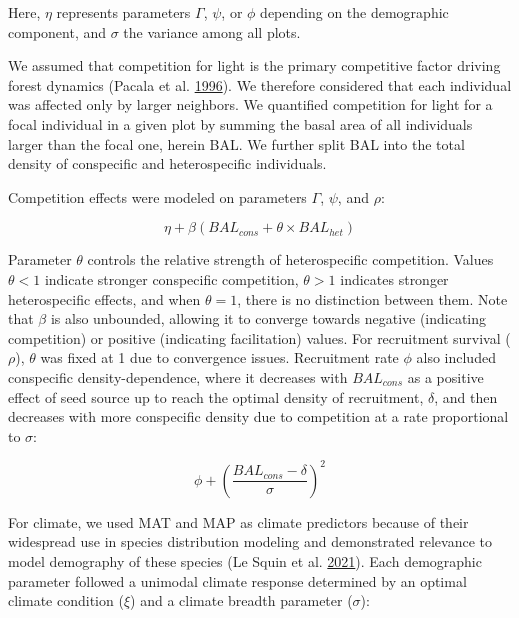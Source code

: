 \documentclass[12pt]{article}
\begin{document}
Here, \(\eta\) represents parameters \(\Gamma\), \(\psi\), or \(\phi\)
depending on the demographic component, and \(\sigma\) the variance
among all plots.

We assumed that competition for light is the primary competitive factor
driving forest dynamics (Pacala et al.
\protect\hyperlink{ref-Pacala1996a}{1996}). We therefore considered that
each individual was affected only by larger neighbors. We quantified
competition for light for a focal individual in a given plot by summing
the basal area of all individuals larger than the focal one, herein BAL.
We further split BAL into the total density of conspecific and
heterospecific individuals.

Competition effects were modeled on parameters \(\Gamma\), \(\psi\), and
\(\rho\):

\begin{equation}
\eta + \beta (BAL_{cons} + \theta \times BAL_{het})
\label{eq:compEffect}\end{equation}

Parameter \(\theta\) controls the relative strength of heterospecific
competition. Values \(\theta < 1\) indicate stronger conspecific
competition, \(\theta > 1\) indicates stronger heterospecific effects,
and when \(\theta = 1\), there is no distinction between them. Note that
\(\beta\) is also unbounded, allowing it to converge towards negative
(indicating competition) or positive (indicating facilitation) values.
For recruitment survival (\(\rho\)), \(\theta\) was fixed at 1 due to
convergence issues. Recruitment rate \(\phi\) also included conspecific
density-dependence, where it decreases with \(BAL_{cons}\) as a positive
effect of seed source up to reach the optimal density of recruitment,
\(\delta\), and then decreases with more conspecific density due to
competition at a rate proportional to \(\sigma\):

\begin{equation}
\phi + \left(\frac{BAL_{cons} - \delta}{\sigma}\right)^2
\label{eq:compingrowth}\end{equation}

For climate, we used MAT and MAP as climate predictors because of their
widespread use in species distribution modeling and demonstrated
relevance to model demography of these species (Le Squin et al.
\protect\hyperlink{ref-LeSquin2021}{2021}). Each demographic parameter
followed a unimodal climate response determined by an optimal climate
condition (\(\xi\)) and a climate breadth parameter (\(\sigma\)):
\end{document}
